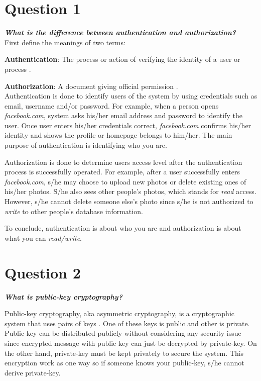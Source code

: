 \documentclass[12pt,letterpaper]{article}
\begin{document}
\section*{Question 1}

\textbf{\textit{What is the difference between authentication and authorization?}}\\

First define the meanings of two terms:

\textbf{Authentication}: The process or action of verifying the identity of a user or process \cite{authentication}.

\textbf{Authorization}: A document giving official permission \cite{authorization}. \\

Authentication is done to identify users of the system by using credentials such as email, username and/or password. For example, when a person opens \textit{facebook.com}, system asks his/her email address and password to identify the user. Once user enters his/her credentials correct, \textit{facebook.com} confirms his/her identity and shows the profile or homepage belongs to him/her. The main purpose of authentication is identifying who you are.

Authorization is done to determine users access level after the authentication process is successfully operated. For example, after a user successfully enters \textit{facebook.com}, s/he may choose to upload new photos or delete existing ones of his/her photos. S/he also sees other people's photos, which stands for \textit{read} access. However, s/he cannot delete someone else's photo since s/he is not authorized to \textit{write} to other people's database information.

To conclude, authentication is about who you are and authorization is about what you can \textit{read/write}.

\section*{Question 2}
\textbf{\textit{What is public-key cryptography?}}

Public-key cryptography, aka asymmetric cryptography, is a cryptographic system that uses pairs of keys \cite{publickey}. One of these keys is public and other is private. Public-key can be distributed publicly without considering any security issue since encrypted message with public key can just be decrypted by private-key. On the other hand, private-key must be kept privately to secure the system. This encryption work as one way so if someone knows your public-key, s/he cannot derive private-key.
\end{document}
